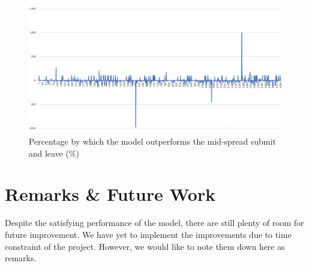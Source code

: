 \documentclass[12pt]{extarticle}
\begin{document}
\begin{figure}[h]
\centering
\includegraphics[width=\textwidth]{midspread}
\caption{Percentage by which the model outperforms the mid-spread submit and leave (\%)}
\label{midspread}
\end{figure}

\section{Remarks \& Future Work}
Despite the satisfying performance of the model, there are still plenty of room
for future improvement. We have yet to implement the improvements due to time constraint
of the project. However, we would like to note them down here as remarks.
\end{document}
